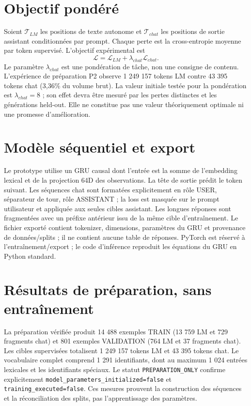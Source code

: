 \documentclass[11pt,a4paper]{report}
\begin{document}
\section{Objectif pondéré}
Soient $\mathcal{T}_{LM}$ les positions de texte autonome et $\mathcal{T}_{chat}$ les positions de sortie assistant conditionnées par prompt. Chaque perte est la cross-entropie moyenne par token supervisé. L'objectif expérimental est
\[
\mathcal{L}=\mathcal{L}_{LM}+\lambda_{chat}\mathcal{L}_{chat}.
\]
Le paramètre $\lambda_{chat}$ est une pondération de tâche, non une consigne de contenu. L'expérience de préparation P2 observe 1 249 157 tokens LM contre 43 395 tokens chat (3,36\% du volume brut). La valeur initiale testée pour la pondération est $\lambda_{chat}=8$ ; son effet devra être mesuré par les pertes distinctes et les générations held-out. Elle ne constitue pas une valeur théoriquement optimale ni une promesse d'amélioration.

\section{Modèle séquentiel et export}
Le prototype utilise un GRU causal dont l'entrée est la somme de l'embedding lexical et de la projection 64D des observations. La tête de sortie prédit le token suivant. Les séquences chat sont formatées explicitement en rôle USER, séparateur de tour, rôle ASSISTANT ; la loss est masquée sur le prompt utilisateur et appliquée aux seules cibles assistant. Les longues réponses sont fragmentées avec un préfixe antérieur issu de la même cible d'entraînement. Le fichier exporté contient tokenizer, dimensions, paramètres du GRU et provenance de données/splits ; il ne contient aucune table de réponses. PyTorch est réservé à l'entraînement/export ; le code d'inférence reproduit les équations du GRU en Python standard.

\section{Résultats de préparation, sans entraînement}
La préparation vérifiée produit 14 488 exemples TRAIN (13 759 LM et 729 fragments chat) et 801 exemples VALIDATION (764 LM et 37 fragments chat). Les cibles supervisées totalisent 1 249 157 tokens LM et 43 395 tokens chat. Le vocabulaire complet comprend 1 291 identifiants, dont au maximum 1 024 entrées lexicales et les identifiants spéciaux. Le statut \texttt{PREPARATION\_ONLY} confirme explicitement \texttt{model\_parameters\_initialized=false} et \texttt{training\_executed=false}. Ces mesures prouvent la construction des séquences et la réconciliation des splits, pas l'apprentissage des paramètres.
\end{document}
